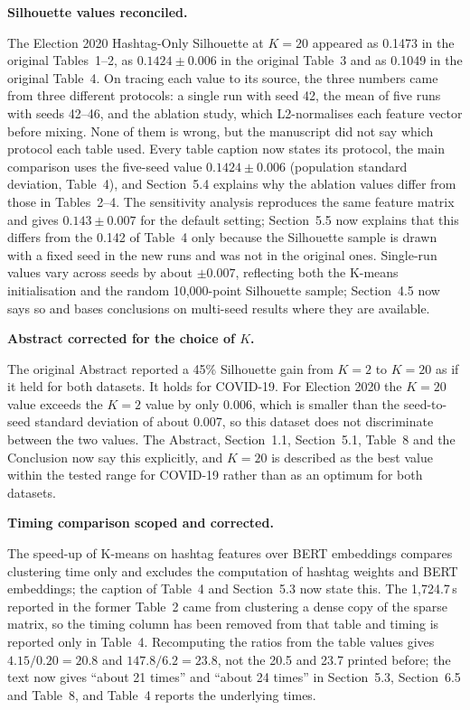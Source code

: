 \documentclass[11pt,a4paper]{article}
\newcommand{\parthead}[1]{\par\medskip\textbf{#1}\par}
\begin{document}
\parthead{Silhouette values reconciled.}
The Election 2020 Hashtag-Only Silhouette at $K = 20$ appeared as 0.1473 in the original Tables~1--2, as $0.1424 \pm 0.006$ in the original Table~3 and as 0.1049 in the original Table~4. On tracing each value to its source, the three numbers came from three different protocols: a single run with seed 42, the mean of five runs with seeds 42--46, and the ablation study, which L2-normalises each feature vector before mixing. None of them is wrong, but the manuscript did not say which protocol each table used. Every table caption now states its protocol, the main comparison uses the five-seed value $0.1424 \pm 0.006$ (population standard deviation, Table~4), and Section~5.4 explains why the ablation values differ from those in Tables~2--4. The sensitivity analysis reproduces the same feature matrix and gives $0.143 \pm 0.007$ for the default setting; Section~5.5 now explains that this differs from the 0.142 of Table~4 only because the Silhouette sample is drawn with a fixed seed in the new runs and was not in the original ones. Single-run values vary across seeds by about $\pm 0.007$, reflecting both the K-means initialisation and the random 10,000-point Silhouette sample; Section~4.5 now says so and bases conclusions on multi-seed results where they are available.

\parthead{Abstract corrected for the choice of $K$.}
The original Abstract reported a 45\% Silhouette gain from $K = 2$ to $K = 20$ as if it held for both datasets. It holds for COVID-19. For Election 2020 the $K = 20$ value exceeds the $K = 2$ value by only 0.006, which is smaller than the seed-to-seed standard deviation of about 0.007, so this dataset does not discriminate between the two values. The Abstract, Section~1.1, Section~5.1, Table~8 and the Conclusion now say this explicitly, and $K = 20$ is described as the best value within the tested range for COVID-19 rather than as an optimum for both datasets.

\parthead{Timing comparison scoped and corrected.}
The speed-up of K-means on hashtag features over BERT embeddings compares clustering time only and excludes the computation of hashtag weights and BERT embeddings; the caption of Table~4 and Section~5.3 now state this. The 1,724.7\,s reported in the former Table~2 came from clustering a dense copy of the sparse matrix, so the timing column has been removed from that table and timing is reported only in Table~4. Recomputing the ratios from the table values gives $4.15/0.20 = 20.8$ and $147.8/6.2 = 23.8$, not the 20.5 and 23.7 printed before; the text now gives ``about 21 times'' and ``about 24 times'' in Section~5.3, Section~6.5 and Table~8, and Table~4 reports the underlying times.
\end{document}
